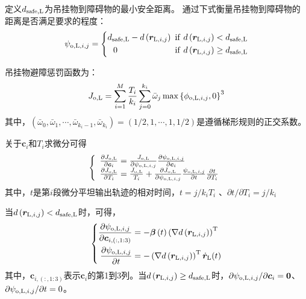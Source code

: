 定义$d_{\rm{safe, L}}$为吊挂物到障碍物的最小安全距离。
通过下式衡量吊挂物到障碍物的距离是否满足要求的程度：
\begin{equation}\label{psi_o_L_i_j}
    \psi_{{\rm{o,L}},i,j} = \left\{
        \begin{aligned}
            d_{\rm{safe, L}} - d\left({\boldsymbol{r}}_{{\rm{L}},i,j}\right) \,\, {\rm{if}} \,\, d\left({\boldsymbol{r}}_{{\rm{L}},i,j}\right) < d_{\rm{safe, L}}\\
            0 \,\,\,\,\,\,\,\,\,\,\,\,\,\,\,\,\,\,\,\,\,\,\,\,\,\,\,\,\,\,\,\,\,\,\,\,\,\,\,\,\, {\rm{if}} \,\, d\left({\boldsymbol{r}}_{{\rm{L}},i,j}\right) \ge d_{\rm{safe, L}}
        \end{aligned}
    \right.
\end{equation}

吊挂物避障惩罚函数为：
\begin{equation}\label{J_o_L}
    J_{\rm{o,L}} = \sum\limits_{i=1}^{M}\frac{T_i}{k_i}\sum\limits_{j=0}^{k_i}\bar{\omega}_j\max\left\{
        \phi_{{\rm{o,L}},i,j} ,0
    \right\}^3
\end{equation}
其中，$\left(\bar{\omega}_0, \bar{\omega}_1, \cdots, \bar{\omega}_{k_i-1}, \bar{\omega}_{k_i}\right) = \left(1/2, 1, \cdots, 1, 1/2\right)$是遵循梯形规则的正交系数。

关于$\boldsymbol{c}_i$和$T_i$求微分可得
\begin{equation}\label{partial_J_o_L}
\left\{\begin{array}{l}
    \frac{\partial J_{\rm{o,L}}}{\partial \boldsymbol{c}_{i}} = \frac{J_{\rm{o,L}}}{\partial \psi_{{\rm{o,L}},i,j}}\frac{\partial \psi_{{\rm{o,L}},i,j}}{\partial \boldsymbol{c}_{i}}\\
    \frac{\partial J_{\rm{o,L}}}{\partial T_i} = \frac{J_{\rm{o,L}}}{T_i} + \frac{\partial J_{\rm{o,L}}}{\partial \psi_{{\rm{o,L}},i,j}}\frac{\psi_{{\rm{o,L}},i,j}}{\partial t}\frac{\partial t}{\partial T_i}
    \end{array}
    \right.
\end{equation}
其中，$t$是第$i$段微分平坦输出轨迹的相对时间，$t = {j}/{k_i}T_i$
、${\partial t}/{\partial T_i} = {j}/{k_i}$

当$d\left({\boldsymbol{r}}_{{\rm{L}},i,j}\right) < d_{\rm{safe, L}}$时，可得，
\begin{equation}\label{partial_psi_o_L_i_j}
    \left\{\begin{aligned}
        \frac{\partial \psi_{{\rm{o,L}},i,j}}{\partial \boldsymbol{c}_{i,(:,1:3)}} &= -\boldsymbol{\beta}\left(t\right)\left(\nabla d\left(\boldsymbol{r}_{{\rm{L}},i,j}\right)\right)^{\rm{T}}\\
        \frac{\partial \psi_{{\rm{o,L}},i,j}}{\partial t} &= -\left(\nabla d \left(\boldsymbol{r}_{{\rm{L}},i,j}\right)\right)^{\rm{T}}\dot{\boldsymbol{r}}_{\rm{L}}(t)
    \end{aligned}
    \right.
\end{equation}
其中，$\boldsymbol{c}_{i,(:,1:3)}$表示$\boldsymbol{c}_i$的第1到3列。当$d\left({\boldsymbol{r}}_{{\rm{L}},i,j}\right) \ge d_{\rm{safe, L}}$时，$\partial \psi_{{\rm{o,L}},i,j}/\partial \boldsymbol{c}_i = \boldsymbol{0}$、$\partial \psi_{{\rm{o,L}},i,j} / \partial t = 0$。

